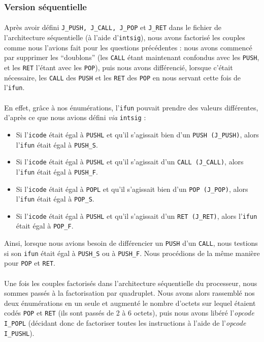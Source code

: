 \documentclass[12pt]{article}
\begin{document}
\subsubsection{Version séquentielle}
\paragraph{}Après avoir défini \verb+J_PUSH, J_CALL, J_POP+ et \verb+J_RET+ dans le fichier de l'architecture séquentielle (à l'aide d'\verb+intsig+), nous avons factorisé les couples comme nous l'avions fait pour les questions précédentes : nous avons commencé par supprimer les ``doublons'' (les \verb+CALL+ étant maintenant confondus avec les \verb+PUSH+, et les \verb+RET+ l'étant avec les \verb+POP+), puis nous avons différencié, lorsque c'était nécessaire, les \verb+CALL+ des \verb+PUSH+ et les \verb+RET+ des \verb+POP+ en nous servant cette fois de l'\verb+ifun+.

\paragraph{}En effet, grâce à nos énumérations, l'\verb+ifun+ pouvait prendre des valeurs différentes, d'après ce que nous avions défini {\itshape via} \verb+intsig+ :
\begin{itemize}
\item Si l'\verb+icode+ était égal à \verb+PUSHL+ et qu'il s'agissait bien d'un \verb+PUSH (J_PUSH)+, alors l'\verb+ifun+ était égal à \verb+PUSH_S+.
\item Si l'\verb+icode+ était égal à \verb+PUSHL+ et qu'il s'agissait d'un \verb+CALL (J_CALL)+, alors l'\verb+ifun+ était égal à \verb+PUSH_F+.
\item Si l'\verb+icode+ était égal à \verb+POPL+ et qu'il s'agissait bien d'un \verb+POP (J_POP)+, alors l'\verb+ifun+ était égal à \verb+POP_S+.
  \item Si l'\verb+icode+ était égal à \verb+PUSHL+ et qu'il s'agissait d'un \verb+RET (J_RET)+, alors l'\verb+ifun+ était égal à \verb+POP_F+.
\end{itemize} 
Ainsi, lorsque nous avions besoin de différencier un \verb+PUSH+ d'un \verb+CALL+, nous testions si son \verb+ifun+ était égal à \verb+PUSH_S+ ou à \verb+PUSH_F+. Nous procédions de la même manière pour \verb+POP+ et \verb+RET+.

\paragraph{}Une fois les couples factorisés dans l'architecture séquentielle du processeur, nous sommes passés à la factorisation par quadruplet. Nous avons alors rassemblé nos deux énumérations en un seule et augmenté le nombre d'octets sur lequel étaient codés \verb+POP+ et \verb+RET+ (ils sont passés de 2 à 6 octets), puis nous avons libéré l'{\itshape opcode} \verb+I_POPL+ (décidant donc de factoriser toutes les instructions à l'aide de l'{\itshape opcode} \verb+I_PUSHL+).
\end{document}

